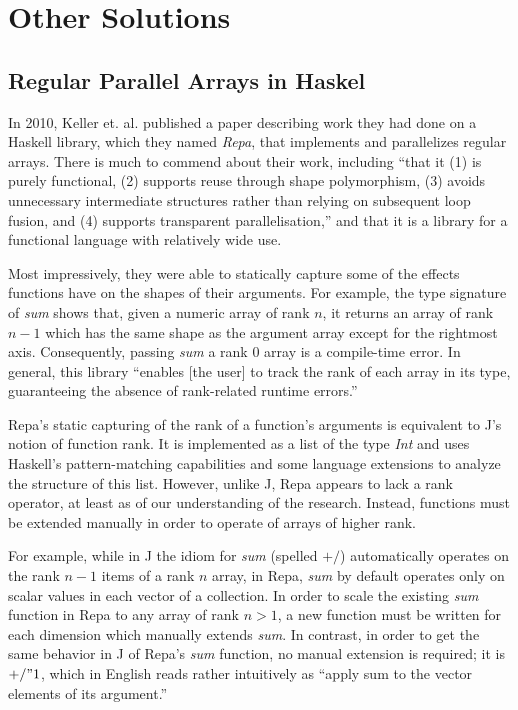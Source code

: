 \section{Other Solutions}
\subsection{Regular Parallel Arrays in Haskel}
In 2010, Keller et. al. published a paper\cite{dph} 
describing work they had done on a Haskell library, which they named \textit{Repa}, that implements and parallelizes regular arrays.
There is much to commend about their work, including ``that it (1) is purely
functional, (2) supports reuse through shape polymorphism, (3)
avoids unnecessary intermediate structures rather than relying on
subsequent loop fusion, and (4) supports transparent parallelisation,''
and that it is a library for a functional language with relatively wide use.

Most impressively, they were able to statically capture some of the effects functions have on the shapes of their arguments.
For example, the type signature of \textit{sum} shows that, given a numeric array of rank $n$, 
it returns an array of rank $n-1$ which has the same shape as the argument array except for the rightmost axis.
Consequently, passing \textit{sum} a rank 0 array is a compile-time error.
In general, this library ``enables [the user] to track the rank of each array in its type,
guaranteeing the absence of rank-related runtime errors.''

Repa's static capturing of the rank of a function's arguments is equivalent to J's notion of function rank.
It is implemented as a list of the type \textit{Int} and uses Haskell's pattern-matching capabilities and some language extensions 
to analyze the structure of this list.
However, unlike J, Repa appears to lack a rank operator, at least as of our understanding of the research.
Instead, functions must be extended manually in order to operate of arrays of higher rank.

For example, while in J the idiom for \textit{sum} (spelled $+/$) automatically operates on the rank $n-1$ items of a rank $n$ array, 
in Repa, \textit{sum} by default operates only on scalar values in each vector of a collection.
In order to scale the existing \textit{sum} function in Repa to any array of rank $n > 1$, 
a new function must be written for each dimension which manually extends \textit{sum}.
In contrast, in order to get the same behavior in J of Repa's \textit{sum} function, no manual extension is required; 
it is $+/ " 1$, which in English reads rather intuitively as ``apply sum to the vector elements of its argument.''

